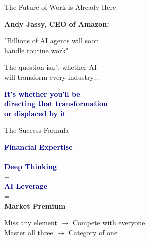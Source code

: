 \documentclass[aspectratio=169,12pt]{beamer}
\begin{document}
\begin{frame}{The Future of Work is Already Here}
\begin{center}
\Large
\textbf{Andy Jassy, CEO of Amazon:}

\vspace{0.3cm}
\normalsize
"Billions of AI agents will soon\\
handle routine work"

\vspace{0.5cm}
\large
The question isn't whether AI\\
will transform every industry...

\vspace{0.3cm}
\Large
\textcolor{darkblue}{\textbf{It's whether you'll be\\
directing that transformation\\
or displaced by it}}
\end{center}
\end{frame}

\begin{frame}{The Success Formula}
\begin{center}
\Large
\textcolor{darkblue}{\textbf{Financial Expertise}}\\
\normalsize +\\
\Large
\textcolor{darkblue}{\textbf{Deep Thinking}}\\
\normalsize +\\
\Large
\textcolor{darkblue}{\textbf{AI Leverage}}\\
\normalsize =\\
\vspace{0.3cm}
\Large
\textcolor{successgreen}{\textbf{Market Premium}}

\vspace{0.5cm}
\normalsize
Miss any element $\rightarrow$ Compete with everyone\\
Master all three $\rightarrow$ Category of one
\end{center}
\end{frame}
\end{document}
